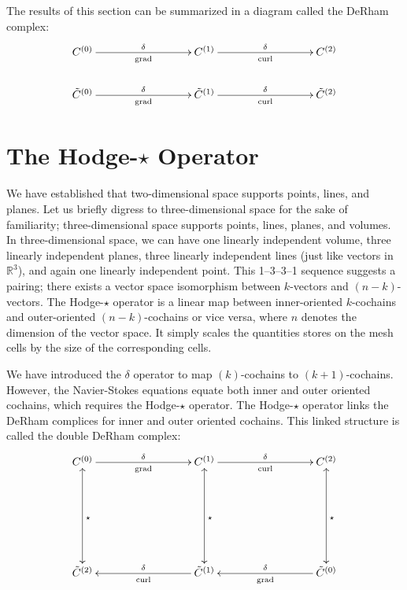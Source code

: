 The results of this section can be summarized in a diagram called the DeRham complex:
\begin{equation}
    \begin{gathered}
        \xymatrix@C=20ex{
            C^{(0)} \ar[r]^{\delta}_{\text{grad}} & C^{(1)} \ar[r]^{\delta}_{\text{curl}} & C^{(2)} \\
            \tilde{C}^{(0)} \ar[r]^{\delta}_{\text{grad}} & \tilde{C}^{(1)} \ar[r]^{\delta}_{\text{curl}} & \tilde{C}^{(2)}
        }
    \end{gathered}
\end{equation}

\section{The Hodge-$\star$ Operator}

We have established that two-dimensional space supports points, lines, and planes. Let us briefly digress to three-dimensional space for the sake of familiarity; three-dimensional space supports points, lines, planes, and volumes. In three-dimensional space, we can have one linearly independent volume, three linearly independent planes, three linearly independent lines (just like vectors in $\mathbb{R}^3$), and again one linearly independent point. This 1--3--3--1 sequence suggests a pairing; there exists a vector space isomorphism between $k$-vectors and $(n-k)$-vectors. The Hodge-$\star$ operator is a linear map between inner-oriented $k$-cochains and outer-oriented $(n-k)$-cochains or vice versa, where $n$ denotes the dimension of the vector space. It simply scales the quantities stores on the mesh cells by the size of the corresponding cells.

We have introduced the $\delta$ operator to map $(k)$-cochains to $(k+1)$-cochains. However, the Navier-Stokes equations equate both inner and outer oriented cochains, which requires the Hodge-$\star$ operator. The Hodge-$\star$ operator links the DeRham complices for inner and outer oriented cochains. This linked structure is called the double DeRham complex:
\begin{equation}
    \begin{gathered}
        \xymatrix@=20ex{
            C^{(0)} \ar[r]^{\delta}_{\text{grad}} \ar@{<->}[d]^{\star} & C^{(1)} \ar[r]^{\delta}_{\text{curl}} \ar@{<->}[d]^{\star} & C^{(2)} \ar@{<->}[d]^{\star} \\
            \tilde{C}^{(2)} & \tilde{C}^{(1)} \ar[l]_{\delta}^{\text{curl}} & \tilde{C}^{(0)} \ar[l]_{\delta}^{\text{grad}}
        }
    \end{gathered}
    \label{eq:doubleDeRham}
\end{equation}

